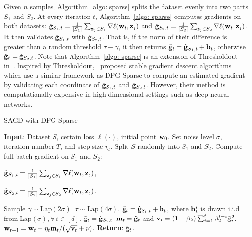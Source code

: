 \documentclass[11pt]{article}
\begin{document}
Given $n$ samples, Algorithm~\ref{algo: sparse} splits the dataset evenly into two parts $S_1$ and $S_2$. At every iteration $t$, Algorithm~\ref{algo: sparse}  computes gradients on both datasets:
$\hat {\mathbf{g}}_{S_1,t} = \frac{1}{|S_1|} \sum_{\mathbf{z}_j \in S_1}\nabla \ell(\mathbf{w}_t, \mathbf{z}_j)$ and $\hat {\mathbf{g}}_{S_2,t} = \frac{1}{|S_2|} \sum_{\mathbf{z}_j \in S_2}\nabla \ell(\mathbf{w}_t, \mathbf{z}_j)$.
It then validates $\hat {\mathbf{g}}_{S_1,t} $ with $\hat {\mathbf{g}}_{S_2,t}$. That is, if the norm of their difference is greater than a random threshold $\tau-\gamma$, it then returns $\tilde {\mathbf{g}}_t = \hat {\mathbf{g}}_{S_1,t} + \mathbf{b}_t$, otherwise $\tilde {\mathbf{g}}_t = \hat {\mathbf{g}}_{S_2,t}$. 
Note that Algorithm~\ref{algo: sparse} is an extension of Thresholdout in~\citet{zhch2018}.
Inspired by Thresholdout,~\citet{zhch2018} proposed stable gradient descent algorithms which use a similar framework as DPG-Sparse to compute an estimated gradient by validating each coordinate of $\hat {\mathbf{g}}_{S_1,t}$ and $\hat {\mathbf{g}}_{S_2,t}$. However, their  method is computationally expensive in high-dimensional settings such as deep neural networks. 



\begin{algorithm}[H]
\caption{\textsc{SAGD} with DPG-Sparse}
\begin{algorithmic}[1]
\label{algo: sparse}
\STATE \textbf{Input}: Dataset $S$,  certain loss $\ell(\cdot)$, initial point $\mathbf{w}_0$.
\STATE Set  noise level $\sigma$, iteration number $T$,  and step size $\eta_t$.
\STATE Split $S$ randomly into $S_1$ and $S_2$. 
\STATE   Compute full batch gradient on $S_1$ and $S_2$:\\
\centerline{$\hat {\mathbf{g}}_{S_1,t} = \frac{1}{|S_1|} \sum_{\mathbf{z}_j \in S_1}\nabla \ell(\mathbf{w}_t, \mathbf{z}_j)$,}
\centerline{$\hat {\mathbf{g}}_{S_2,t} = \frac{1}{|S_2|} \sum_{\mathbf{z}_j \in S_2}\nabla \ell(\mathbf{w}_t, \mathbf{z}_j)$.}
\STATE Sample $\gamma \sim \text{Lap}(2\sigma)$, $\tau \sim \text{Lap}(4\sigma)$.
\STATE  $\tilde {\mathbf{g}}_t = \hat {\mathbf{g}}_{S_1,t} + \mathbf{b}_t$, where $\mathbf{b}_t^i$ is drawn i.i.d from Lap$(\sigma), \forall\, i \in [d]$.
\ELSE \STATE $\tilde {\mathbf{g}}_t = \hat {\mathbf{g}}_{S_2,t}$
\ENDIF
\STATE 
$\mathbf{m}_t = \tilde {\mathbf{g}}_t$ and $\mathbf{v}_t = \left(1-\beta_{2}\right) \sum_{i=1}^{t} \beta_{2}^{t-i} \tilde {\mathbf{g}}_{i}^{2}$.
\STATE $\mathbf{w}_{t+1}=\mathbf{w}_{t}-\eta_t \mathbf{m}_t /(\sqrt{\mathbf{v}_t}+\nu)$.
\ENDFOR 
\STATE \textbf{Return}: $\tilde {\mathbf{g}}_t$.
\end{algorithmic}
\end{algorithm}
\end{document}
